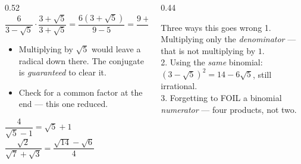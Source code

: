 \documentclass[aspectratio=169, 11pt]{beamer}
\begin{document}
\begin{frame}[t, plain]
  \begin{columns}[T]
    \begin{column}{0.52\textwidth}
      \[ \frac{6}{3-\sqrt5}\cdot\frac{3+\sqrt5}{3+\sqrt5}
         = \frac{6\left(3+\sqrt5\right)}{9-5}
         = \frac{9+3\sqrt5}{2} \]
      \vspace{-6pt}
      \footnotesize
      \begin{itemize}\setlength{\itemsep}{4pt}
        \item Multiplying by $\sqrt5$ would leave a radical down there. The conjugate is
              \emph{guaranteed} to clear it.
        \item Check for a common factor at the end --- this one reduced.
      \end{itemize}
      \vspace{5pt}
      {\footnotesize $\dfrac{4}{\sqrt5-1}=\sqrt5+1$ \qquad
      $\dfrac{\sqrt2}{\sqrt7+\sqrt3}=\dfrac{\sqrt{14}-\sqrt6}{4}$}
    \end{column}
    \begin{column}{0.44\textwidth}
      \begin{block}{Three ways this goes wrong}
        \footnotesize
        1. Multiplying only the \emph{denominator} --- that is not multiplying by $1$. \\[4pt]
        2. Using the \emph{same} binomial: $\left(3-\sqrt5\right)^{2}=14-6\sqrt5$, still
        irrational. \\[4pt]
        3. Forgetting to FOIL a binomial \emph{numerator} --- four products, not two.
      \end{block}
    \end{column}
  \end{columns}
\end{frame}
\end{document}
